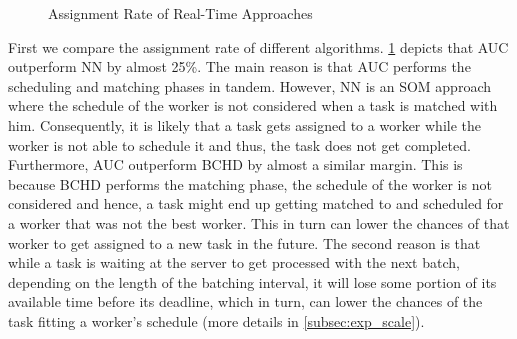 \begin{figure}[h]
    \centering
    \vspace{-0.15in}
    \caption{Assignment Rate of Real-Time Approaches}
    \label{fig:quality}
\end{figure}

First we compare the assignment rate of different algorithms. \cref{fig:quality} depicts that AUC outperform NN by almost 25\%. The main reason is that AUC performs the scheduling and matching phases in tandem. However, NN is an SOM approach where the schedule of the worker is not considered when a task is matched with him. Consequently, it is likely that a task gets assigned to a worker while the worker is not able to schedule it and thus, the task does not get completed. Furthermore, AUC outperform BCHD by almost a similar margin. This is because BCHD performs the matching phase, the schedule of the worker is not considered and hence, a task might end up getting matched to and scheduled for a worker that was not the best worker. This in turn can lower the chances of that worker to get assigned to a new task in the future. The second reason is that while a task is waiting at the server to get processed with the next batch, depending on the length of the batching  interval, it will lose some portion of its available time before its deadline, which in turn, can lower the chances of the task fitting a worker's schedule (more details in \cref{subsec:exp_scale}).

